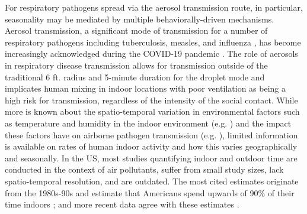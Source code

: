\documentclass{article}
\begin{document}
For respiratory pathogens spread via the aerosol transmission route, in particular, seasonality may be mediated by multiple behaviorally-driven mechanisms. Aerosol transmission, a significant mode of transmission for a number of respiratory pathogens including tuberculosis, measles, and influenza \cite{tellier2019recognition}, has become increasingly acknowledged during the COVID-19 pandemic \cite{greenhalgh2021ten, wang2021airborne, jayaweera2020transmission, klompas2020airborne, morawska2020time}. The role of aerosols in respiratory disease transmission allows for transmission outside of the traditional 6 ft. radius and 5-minute duration for the droplet mode and implicates human mixing in indoor locations with poor ventilation as being a high risk for transmission, regardless of the intensity of the social contact.
While more is known about the spatio-temporal variation in environmental factors such as temperature and humidity in the indoor environment (e.g. \cite{nguyen2016daily}) and the impact these  factors have on airborne pathogen transmission (e.g. \cite{robey2022sensitivity, yang2011dynamics}), limited information is available on rates of human indoor activity and how this varies geographically and seasonally. In the US, most studies quantifying indoor and outdoor time are conducted in the context of air pollutants, suffer from small study sizes, lack spatio-temporal resolution, and are outdated. 
The most cited estimates originate from the 1980s-90s and estimate that Americans spend upwards of 90\% of their time indoors \cite{ott1988human}; and more recent data agree with these estimates \cite{klepeis2001national, spalt2016time}. 
\end{document}
